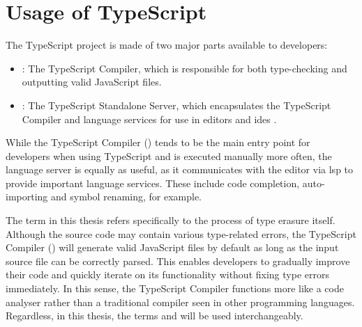 \section{Usage of TypeScript}

The TypeScript project is made of two major parts available to developers:

\begin{itemize}
  \item {}: The TypeScript Compiler, which is responsible for both type-checking and outputting valid JavaScript files.
  \item {}: The TypeScript Standalone Server, which encapsulates the TypeScript Compiler and language services for use in editors and \acrshort{ide}s \cite{StandaloneServerTsserver}.
\end{itemize}

While the TypeScript Compiler () tends to be the main entry point for developers when using TypeScript and is executed manually more often, the language server is equally as useful, as it communicates with the editor via \acrfull{lsp} to provide important language services. These include code completion, auto-importing and symbol renaming, for example.

The term  in this thesis refers specifically to the process of type erasure itself. Although the source code may contain various type-related errors, the TypeScript Compiler () will generate valid JavaScript files by default as long as the input source file can be correctly parsed. This enables developers to gradually improve their code and quickly iterate on its functionality without fixing type errors immediately. In this sense, the TypeScript Compiler functions more like a code analyser rather than a traditional compiler seen in other programming languages. Regardless, in this thesis, the terms  and  will be used interchangeably.